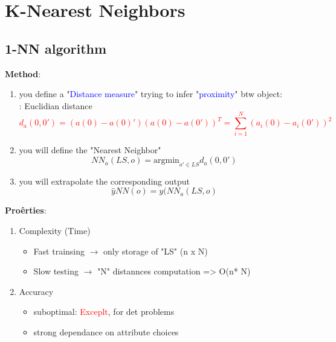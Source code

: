 \section{K-Nearest Neighbors}

\subsection{1-NN algorithm}
\textbf{Method}: 
\begin{enumerate}
    \item you define a "\textcolor{blue}{Distance measure}" trying to infer "\textcolor{blue}{proximity}" btw object:\\
    \example : Euclidian distance 
    \textcolor{red}{$$d_a(0,0')= (a(0)-a(0)')  (a(0)-a(0'))^T = \sum_{i=1}^N(a_i(0)-a_i(0'))^2$$}
    \item you will define the "Nearest Neighbor"
    $$NN_a(LS,o) = \textrm{argmin}_{o' \in LS } d_a(0,0')$$
    \item you will extrapolate the corresponding output
    $$\hat{y}NN(o) = y(NN_a(LS,o)$$
\end{enumerate}
\textbf{Proêrties}:
\begin{enumerate}
    \item Complexity (Time)
    \begin{itemize}
        \item Fast trainsing $\rightarrow$ only storage of "LS" (n x N)
        \item Slow testing $\rightarrow$ "N" distannces computation => O(n* N)
    \end{itemize}
    \item Accuracy
    \begin{itemize}
        \item suboptimal: \textcolor{red}{Exceplt}, for det problems
        \item strong dependance on attribute choices
    \end{itemize}
\end{enumerate}